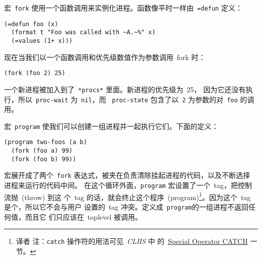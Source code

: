 宏~\texttt{fork} 使用一个函数调用来实例化进程。函数像平时一样由~\texttt{=defun} 定义：

\begin{lstlisting}
(=defun foo (x)
  (format t "Foo was called with ~A.~%" x)
  (=values (1+ x)))
\end{lstlisting}

现在当我们以一个函数调用和优先级数值作为参数调用~fork 时：

\begin{lstlisting}
(fork (foo 2) 25)
\end{lstlisting}
一个新进程被加入到了~\texttt{*procs*} 里面。新进程的优先级为~25，
因为它还没有执行，所以~\texttt{proc-wait} 为~\texttt{nil}，而
~\texttt{proc-state} 包含了以~\texttt{2} 为参数的对~\texttt{foo} 的调用。

宏~\texttt{program} 使我们可以创建一组进程并一起执行它们。下面的定义：

\begin{lstlisting}
(program two-foos (a b)
  (fork (foo a) 99)
  (fork (foo b) 99))
\end{lstlisting}
宏展开成了两个~\texttt{fork} 表达式，被夹在负责清除挂起进程的代码，以及不断选择
进程来运行的代码中间。%
在这个循环外面，\texttt{program} 宏设置了一个~tag，把控制流抛~(throw) 到这
个~tag 的话，就会终止这个程序~(program)\footnote{译者
  注：\texttt{catch} 操作符的用法可见~\emph{CLHS} 中
  的~\href{http://www.lisp.org/HyperSpec/Body/speope_catch.html}{Special
    Operator CATCH} 一节。}。因为这个~tag 是个\gensym，所以它不会与用户
设置的~tag 冲突。定义成~\texttt{program}的一组进程不返回任何值，而且它
们只应该在~toplevel 被调用。

